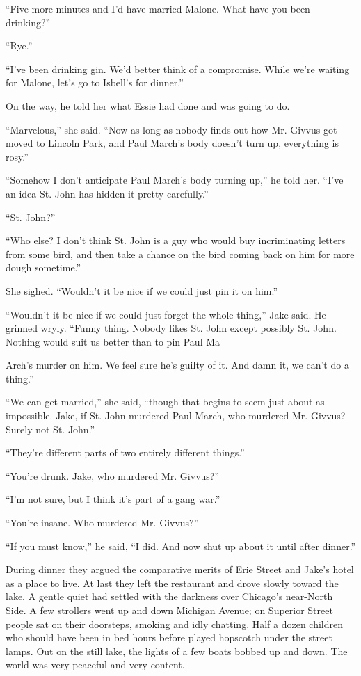 \documentclass{novel}
\begin{document}
“Five more minutes and I’d have married Malone. What have you been drinking?”

“Rye.”

“I’ve been drinking gin. We’d better think of a compromise. While we’re waiting for Malone, let’s go to Isbell’s for dinner.”

On the way, he told her what Essie had done and was going to do.

“Marvelous,” she said. “Now as long as nobody finds out how Mr. Givvus got moved to Lincoln Park, and Paul March’s body doesn’t turn up, everything is rosy.”

“Somehow I don’t anticipate Paul March’s body turning up,” he told her. “I’ve an idea St. John has hidden it pretty carefully.”

“St. John?”

“Who else? I don’t think St. John is a guy who would buy incriminating letters from some bird, and then take a chance on the bird coming back on him for more dough sometime.”

She sighed. “Wouldn’t it be nice if we could just pin it on him.”

“Wouldn’t it be nice if we could just forget the whole thing,” Jake said. He grinned wryly. “Funny thing. Nobody likes St. John except possibly St. John. Nothing would suit us better than to pin Paul Ma

Arch’s murder on him. We feel sure he’s guilty of it. And damn it, we can’t do a thing.”

“We can get married,” she said, “though that begins to seem just about as impossible. Jake, if St. John murdered Paul March, who murdered Mr. Givvus? Surely not St. John.”

“They’re different parts of two entirely different things.”

“You’re drunk. Jake, who murdered Mr. Givvus?”

“I’m not sure, but I think it’s part of a gang war.”

“You’re insane. Who murdered Mr. Givvus?”

“If you must know,” he said, “I did. And now shut up about it until after dinner.”

During dinner they argued the comparative merits of Erie Street and Jake’s hotel as a place to live. At last they left the restaurant and drove slowly toward the lake. A gentle quiet had settled with the darkness over Chicago’s near-North Side. A few strollers went up and down Michigan Avenue; on Superior Street people sat on their doorsteps, smoking and idly chatting. Half a dozen children who should have been in bed hours before played hopscotch under the street lamps. Out on the still lake, the lights of a few boats bobbed up and down. The world was very peaceful and very content.
\end{document}
